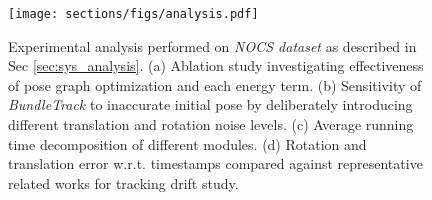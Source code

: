 \documentclass[letterpaper, 10 pt, conference]{ieeeconf}
\begin{document}
\begin{figure}[ht]
  \centering
  \texttt{[image: sections/figs/analysis.pdf]}
  \vspace{-0.25in}\caption{Experimental analysis performed on \textit{NOCS dataset} as described in Sec \ref{sec:sys_analysis}. (a) Ablation study investigating effectiveness of pose graph optimization and each energy term. (b) Sensitivity of \textit{BundleTrack} to inaccurate initial pose by deliberately introducing different translation and rotation noise levels. (c) Average running time decomposition of different modules. (d) Rotation and translation error w.r.t. timestamps compared against representative related works \cite{wang20196-pack,runz2018maskfusion,Yang20troteaser} for tracking drift study.}
  \label{fig:analysis}
  \vspace{-0.3in}
\end{figure}
\end{document}
